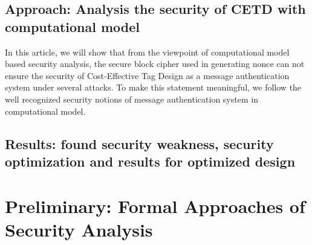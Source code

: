 \documentclass{article}
\begin{document}
\subsection{Approach: Analysis the security of CETD with computational model}
In this article, we will show that from the viewpoint of computational model based security analysis, the secure block cipher used in generating nonce can not ensure the security of Cost-Effective Tag Design as a message authentication system under several attacks. To make this statement meaningful, we follow the well recognized security notions of message authentication system in computational model.
\subsection{Results: found security weakness, security optimization and results for optimized design }

\section{Preliminary: Formal Approaches of Security Analysis}
\end{document}
